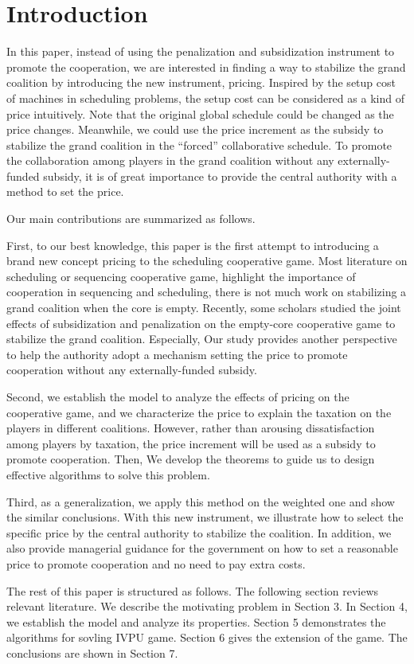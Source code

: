 \section{Introduction}

In this paper, instead of using the penalization and subsidization instrument to promote the cooperation, we are interested in finding a way to stabilize the grand coalition by introducing the new instrument, pricing. Inspired by the setup cost of machines in scheduling problems, the setup cost can be considered as a kind of price intuitively. Note that the original global schedule could be changed as the price changes. Meanwhile, we could use the price increment as the subsidy to stabilize the grand coalition in the “forced” collaborative schedule.
To promote the collaboration among players in the grand coalition without any externally-funded subsidy, it is of great importance to provide the central authority with a method to set the price.

Our main contributions are summarized as follows.

First, to our best knowledge, this paper is the first attempt to introducing a brand new concept pricing to the scheduling cooperative game. Most literature on scheduling or sequencing cooperative game, highlight the importance of cooperation in sequencing and scheduling, there is not much work on stabilizing a grand coalition when the core is empty. Recently, some scholars studied the joint effects of subsidization and penalization on the empty-core cooperative game to stabilize the grand coalition. Especially, Our study provides another perspective to help the authority adopt a mechanism setting the price to promote cooperation without any externally-funded subsidy.

Second, we establish the model to analyze the effects of pricing on the cooperative game, and we characterize the price to explain the taxation on the players in different coalitions. However, rather than arousing dissatisfaction among players by taxation, the price increment will be used as a subsidy to promote cooperation. Then, We develop the theorems to guide us to design effective algorithms to solve this problem.

Third, as a generalization, we apply this method on the weighted one and show the similar conclusions. With this new instrument, we illustrate how to select the specific price by the central authority to stabilize the coalition. In addition, we also provide managerial guidance for the government on how to set a reasonable price to promote cooperation and no need to pay extra costs.


The rest of this paper is structured as follows. The following section reviews relevant literature. We describe the motivating problem in Section 3. In Section 4, we establish the model and analyze its properties. Section 5 demonstrates the algorithms for sovling IVPU game. Section 6 gives the extension of the game. The conclusions are shown in Section 7.
